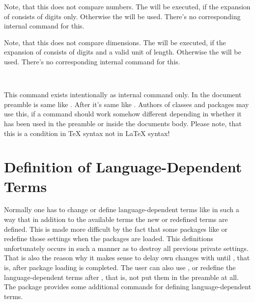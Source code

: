 \begin{Declaration}
\end{Declaration}
%
Note, that this does not compare numbers.  The  will
be executed, if the expansion of  consists of digits
only. Otherwise the  will be used. There's no
corresponding internal command for this.
%
%


\begin{Declaration}
\end{Declaration}
%
Note, that this does not compare dimensions. The  will
be executed, if the expansion of  consists of digits and a valid
unit of length. Otherwise the  will be used. There's no
corresponding internal command for this.
%
%


\begin{Declaration}
  \  
  \  
\end{Declaration}
%
This command exists intentionally as internal command only. In the document
preamble  is same like . After
 it's same like . Authors of
classes and packages may use this, if a command should work somehow different
depending in whether it has been used in the preamble or inside the documents
body. Please note, that this is a condition in \TeX{}
syntax not in \LaTeX{} syntax!
%
%


\section{Definition of Language-Dependent Terms}
\label{sec:scrbase.languageSupport}

Normally one has to change or define language-dependent terms like
 in such a way that in addition to the available terms
the new or redefined terms are defined. This is made more difficult by the
fact that some packages like  or
 redefine those settings when the
packages are loaded. This definitions unfortunately occurs in such a manner as
to destroy all previous private settings. That is also the reason why it makes
sense to delay own changes with  until
, that is, after package loading is
completed. The user can also use , or redefine the
language-dependent terms after , that is,
not put them in the preamble at all. The package 
provides some additional commands for defining language-dependent terms.


